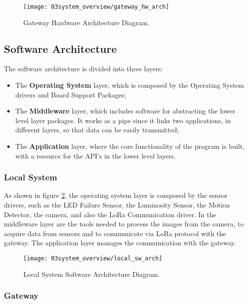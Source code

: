\begin{figure}[H]
	\centering
	\texttt{[image: 03system\_overview/gateway\_hw\_arch]}
	\caption{Gateway Hardware Architecture Diagram.}
	\label{fig:gateway_hw_arch}
\end{figure}

\subsection{Software Architecture}
The software architecture is divided into three layers:
\begin{itemize}
        \item The \textbf{Operating System} layer, which is composed by the Operating System drivers and Board Support Packages;
        \item The \textbf{Middleware} layer, which includes software for abstracting the lower level layer packages. It works as a pipe since it links two applications, in different layers, so that data can be easily transmitted;
        \item The \textbf{Application} layer, where the core functionality of the program is built, with a resource for the API's in the lower level layers.
\end{itemize}

\subsubsection{Local System}

As shown in figure \ref{fig:local_sw_arch}, the operating system layer is composed by the sensor drivers, such as the LED Failure Sensor, the Luminosity Sensor, the Motion Detector, the camera, and also the LoRa Communication driver. In the middleware layer are the tools needed to process the images from the camera, to acquire data from sensors and to communicate via LoRa protocol with the gateway. The application layer manages the communication with the gateway.

\begin{figure}[H]
	\centering
	\texttt{[image: 03system\_overview/local\_sw\_arch]}
	\caption{Local System Software Architecture Diagram.}
	\label{fig:local_sw_arch}
\end{figure}

\subsubsection{Gateway}

